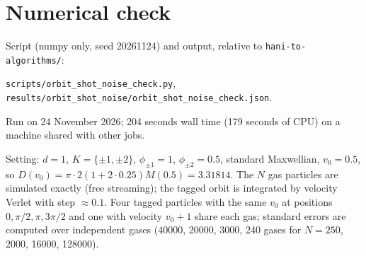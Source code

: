 \documentclass[11pt]{article}
\theoremstyle{remark}
\begin{document}
\section{Numerical check}\label{sec:num}

Script (numpy only, seed 20261124) and output, relative to
\texttt{hani-to-algorithms/}:
\begin{center}
\texttt{scripts/orbit\_shot\_noise\_check.py},\qquad
\texttt{results/orbit\_shot\_noise/orbit\_shot\_noise\_check.json}.
\end{center}
Run on 24 November 2026; 204 seconds wall time (179 seconds of CPU) on a
machine shared with other jobs.

Setting: $d=1$, $K=\{\pm1,\pm2\}$, $\phi_{\pm1}=1$, $\phi_{\pm2}=0.5$,
standard Maxwellian, $v_0=0.5$, so
$D(v_0)=\pi\cdot2(1+2\cdot0.25)M(0.5)=3.31814$. The $N$ gas particles are
simulated exactly (free streaming); the tagged orbit is integrated by
velocity Verlet with step $\approx0.1$. Four tagged particles with the same
$v_0$ at positions $0,\pi/2,\pi,3\pi/2$ and one with velocity $v_0+1$ share
each gas; standard errors are computed over independent gases (40000, 20000,
3000, 240 gases for $N=250$, 2000, 16000, 128000).
\end{document}
